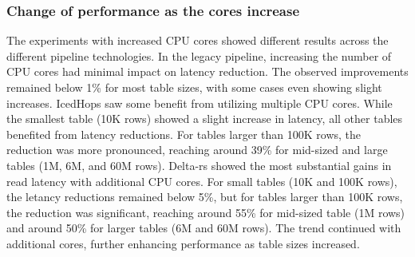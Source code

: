 \subsubsection*{Change of performance as the  cores increase}
The experiments with increased \gls{CPU} cores showed different results across the different pipeline technologies. In the legacy pipeline, increasing the number of \gls{CPU} cores had minimal impact on latency reduction. The observed improvements remained below 1\% for most table sizes, with some cases even showing slight increases.
IcedHops saw some benefit from utilizing multiple \gls{CPU} cores. While the smallest table (10K rows) showed a slight increase in latency, all other tables benefited from latency reductions. For tables larger than 100K rows, the reduction was more pronounced, reaching around 39\% for mid-sized and large tables (1M, 6M, and 60M rows).
Delta-rs showed the most substantial gains in read latency with additional CPU cores. For small tables (10K and 100K rows), the letancy reductions remained below 5\%, but for tables larger than 100K rows, the reduction was significant, reaching around 55\% for mid-sized table (1M rows) and around 50\% for larger tables (6M and 60M rows).
The trend continued with additional cores, further enhancing performance as table sizes increased.



